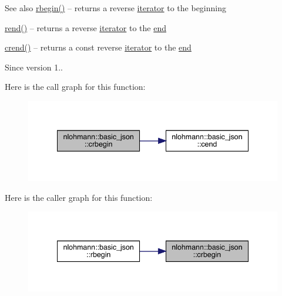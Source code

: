 \begin{DoxySeeAlso}{See also}
\mbox{\hyperlink{classnlohmann_1_1basic__json_a1ef93e2006dbe52667294f5ef38b0b10}{rbegin()}} -- returns a reverse \mbox{\hyperlink{classnlohmann_1_1basic__json_a099316232c76c034030a38faa6e34dca}{iterator}} to the beginning 

\mbox{\hyperlink{classnlohmann_1_1basic__json_ac77aed0925d447744676725ab0b6d535}{rend()}} -- returns a reverse \mbox{\hyperlink{classnlohmann_1_1basic__json_a099316232c76c034030a38faa6e34dca}{iterator}} to the \mbox{\hyperlink{classnlohmann_1_1basic__json_a13e032a02a7fd8a93fdddc2fcbc4763c}{end}} 

\mbox{\hyperlink{classnlohmann_1_1basic__json_a5795b029dbf28e0cb2c7a439ec5d0a88}{crend()}} -- returns a const reverse \mbox{\hyperlink{classnlohmann_1_1basic__json_a099316232c76c034030a38faa6e34dca}{iterator}} to the \mbox{\hyperlink{classnlohmann_1_1basic__json_a13e032a02a7fd8a93fdddc2fcbc4763c}{end}}
\end{DoxySeeAlso}
\begin{DoxySince}{Since}
version 1.. 
\end{DoxySince}
Here is the call graph for this function\+:
\nopagebreak
\begin{figure}[H]
\begin{center}
\leavevmode
\includegraphics[width=341pt]{classnlohmann_1_1basic__json_a1e0769d22d54573f294da0e5c6abc9de_cgraph}
\end{center}
\end{figure}
Here is the caller graph for this function\+:
\nopagebreak
\begin{figure}[H]
\begin{center}
\leavevmode
\includegraphics[width=341pt]{classnlohmann_1_1basic__json_a1e0769d22d54573f294da0e5c6abc9de_icgraph}
\end{center}
\end{figure}
